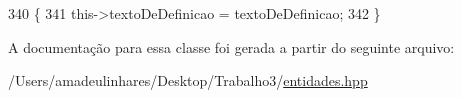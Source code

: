\begin{DoxyCode}
340 \{
341   this->textoDeDefinicao = textoDeDefinicao;
342 \}
\end{DoxyCode}


A documentação para essa classe foi gerada a partir do seguinte arquivo\+:\begin{DoxyCompactItemize}
\item 
/\+Users/amadeulinhares/\+Desktop/\+Trabalho3/\mbox{\hyperlink{entidades_8hpp}{entidades.\+hpp}}\end{DoxyCompactItemize}
